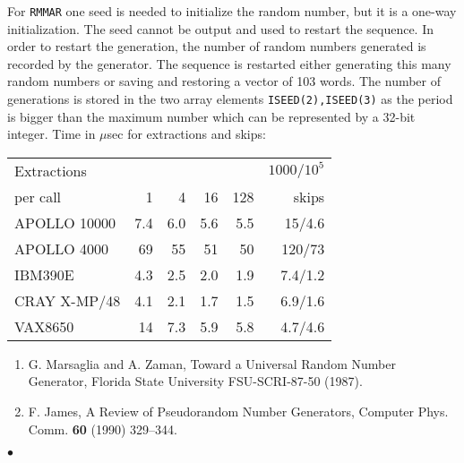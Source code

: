 \newpage
For {\tt RMMAR} one seed is needed to initialize the random
number, but it is a one-way initialization. The seed cannot be
output and used to restart the sequence. In order to restart the
generation, the number of random numbers generated is recorded by
the generator. The sequence is restarted either generating this
many random numbers or saving and restoring a vector of 103 words.
The number of generations is stored in the two array elements
{\tt ISEED(2),ISEED(3)} as the period is bigger than the maximum
number which can be represented by a 32-bit integer.
\Timing
Time in $\mu$sec for extractions and skips:
\begin{center}
\begin{tabular}{|l|r|r|r|r|r|}
\hline
Extractions  &     &     &     &     & $1000/10^5$ \\
per call     & 1   & 4   & 16  & 128 & skips \\ \hline
APOLLO 10000 & 7.4 & 6.0 & 5.6 & 5.5 & 15/4.6 \\
APOLLO 4000  & 69  & 55  & 51  & 50  & 120/73 \\
IBM390E      & 4.3 & 2.5 & 2.0 & 1.9 & 7.4/1.2\\
CRAY X-MP/48 & 4.1 & 2.1 & 1.7 & 1.5 & 6.9/1.6\\
VAX8650      & 14  & 7.3 & 5.9 & 5.8 & 4.7/4.6\\ \hline
\end{tabular}
\end{center}
\Refer
\begin{enumerate}
\item G. Marsaglia and A. Zaman, Toward a Universal Random Number
Generator, Florida State University FSU-SCRI-87-50 (1987).
\item F. James, A Review of Pseudorandom Number Generators,
Computer Phys. Comm. {\bf 60} (1990) 329--344.
\end{enumerate}
$\bullet$
